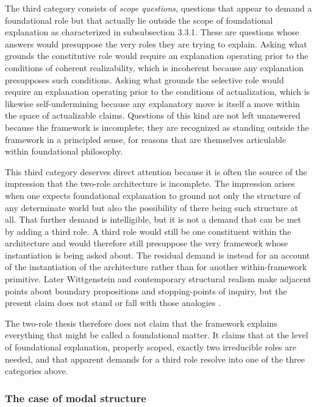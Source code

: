 \documentclass[11pt]{article}
\theoremstyle{foundation}
\begin{document}
The third category consists of \emph{scope questions}, questions that appear to demand a foundational role but that actually lie outside the scope of foundational explanation as characterized in subsubsection 3.3.1. These are questions whose answers would presuppose the very roles they are trying to explain. Asking what grounds the constitutive role would require an explanation operating prior to the conditions of coherent realizability, which is incoherent because any explanation presupposes such conditions. Asking what grounds the selective role would require an explanation operating prior to the conditions of actualization, which is likewise self-undermining because any explanatory move is itself a move within the space of actualizable claims. Questions of this kind are not left unanswered because the framework is incomplete; they are recognized as standing outside the framework in a principled sense, for reasons that are themselves articulable within foundational philosophy.

This third category deserves direct attention because it is often the source of the impression that the two-role architecture is incomplete. The impression arises when one expects foundational explanation to ground not only the structure of any determinate world but also the possibility of there being such structure at all. That further demand is intelligible, but it is not a demand that can be met by adding a third role. A third role would still be one constituent within the architecture and would therefore still presuppose the very framework whose instantiation is being asked about. The residual demand is instead for an account of the instantiation of the architecture rather than for another within-framework primitive. Later Wittgenstein and contemporary structural realism make adjacent points about boundary propositions and stopping-points of inquiry, but the present claim does not stand or fall with those analogies \citep{Wittgenstein1969,LadymanRoss2007,French2014}.

The two-role thesis therefore does not claim that the framework explains everything that might be called a foundational matter. It claims that at the level of foundational explanation, properly scoped, exactly two irreducible roles are needed, and that apparent demands for a third role resolve into one of the three categories above.

\subsubsection{The case of modal structure}
\end{document}
